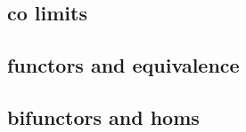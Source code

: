 \subsection{co limits}





%



%


%

\subsection{functors and equivalence}




%
%
%

\subsection{bifunctors and homs}






